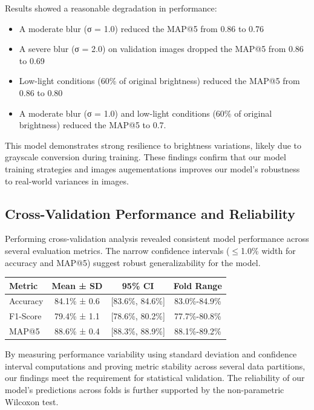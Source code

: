 \documentclass[twocolumn]{article}
\begin{document}
Results showed a reasonable degradation in performance:
 \begin{itemize}
     \item A moderate blur (σ = 1.0) reduced the MAP@5 from 0.86 to 0.76
     \item A severe blur (σ = 2.0) on validation images dropped the MAP@5 from 0.86 to 0.69
     \item Low-light conditions (60\% of original brightness) reduced the MAP@5 from 0.86 to 0.80
     \item A moderate blur (σ = 1.0) and low-light conditions (60\% of original brightness) reduced the MAP@5 to 0.7.
 \end{itemize}

This model demonstrates strong resilience to brightness variations, likely due to grayscale conversion during training. These findings confirm that our model training strategies and images augementations improves our model's robustness to real-world variances in images.

\subsection{Cross-Validation Performance and Reliability}

Performing cross-validation analysis revealed consistent model performance across several evaluation metrics. The narrow confidence intervals (\(\leq\)1.0\% width for accuracy and MAP@5) suggest robust generalizability for the model.

\begin{table}
\begin{tabular}{l c c c}
\hline
\textbf{Metric} & \textbf{Mean ± SD} & \textbf{95\% CI} & \textbf{Fold Range} \\ \hline
Accuracy & 84.1\% ± 0.6 & [83.6\%, 84.6\%] & 83.0\%-84.9\% \\
F1-Score & 79.4\% ± 1.1 & [78.6\%, 80.2\%] & 77.7\%-80.8\% \\
MAP@5 & 88.6\% ± 0.4 & [88.3\%, 88.9\%] & 88.1\%-89.2\% \\ \hline
\end{tabular}
\end{table}

By measuring performance variability using standard deviation and confidence interval computations and proving metric stability across several data partitions, our findings meet the requirement for statistical validation. The reliability of our model's predictions across folds is further supported by the non-parametric Wilcoxon test. 
\end{document}
